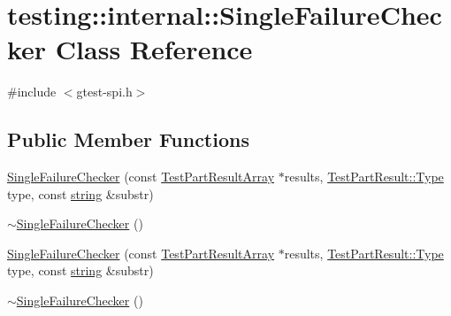 \hypertarget{classtesting_1_1internal_1_1_single_failure_checker}{\section{testing\-:\-:internal\-:\-:Single\-Failure\-Checker Class Reference}
\label{classtesting_1_1internal_1_1_single_failure_checker}
}


{\ttfamily \#include $<$gtest-\/spi.\-h$>$}

\subsection*{Public Member Functions}
\begin{DoxyCompactItemize}
\item 
\hyperlink{classtesting_1_1internal_1_1_single_failure_checker_a6d350d385526c97c9982e928f5f8fb56}{Single\-Failure\-Checker} (const \hyperlink{classtesting_1_1_test_part_result_array}{Test\-Part\-Result\-Array} $\ast$results, \hyperlink{classtesting_1_1_test_part_result_a65ae656b33fdfdfffaf34858778a52d5}{Test\-Part\-Result\-::\-Type} type, const \hyperlink{namespacetesting_1_1internal_a5ca8a348395a6145775c1a2334e21889}{string} \&substr)
\item 
\hyperlink{classtesting_1_1internal_1_1_single_failure_checker_a4b0a907c9c1b350c79d70af138e9f0bf}{$\sim$\-Single\-Failure\-Checker} ()
\item 
\hyperlink{classtesting_1_1internal_1_1_single_failure_checker_a6d350d385526c97c9982e928f5f8fb56}{Single\-Failure\-Checker} (const \hyperlink{classtesting_1_1_test_part_result_array}{Test\-Part\-Result\-Array} $\ast$results, \hyperlink{classtesting_1_1_test_part_result_a65ae656b33fdfdfffaf34858778a52d5}{Test\-Part\-Result\-::\-Type} type, const \hyperlink{namespacetesting_1_1internal_a5ca8a348395a6145775c1a2334e21889}{string} \&substr)
\item 
\hyperlink{classtesting_1_1internal_1_1_single_failure_checker_a4b0a907c9c1b350c79d70af138e9f0bf}{$\sim$\-Single\-Failure\-Checker} ()
\end{DoxyCompactItemize}



